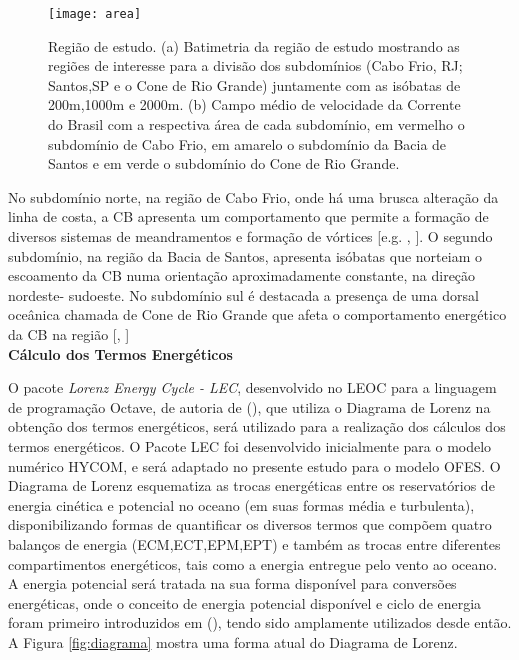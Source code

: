 \documentclass[portuguese,12pt,a4paper]{article}
\begin{document}
\begin{figure}[H]
	\centering
	\texttt{[image: area]}
	\caption{Região de estudo. (a) Batimetria da região de estudo mostrando as regiões de interesse para a divisão dos subdomínios (Cabo Frio, RJ; Santos,SP e o Cone de Rio Grande) juntamente com as isóbatas de 200m,1000m e 2000m. (b) Campo médio de velocidade da Corrente do Brasil com a respectiva área de cada subdomínio, em vermelho o subdomínio de Cabo Frio, em amarelo o subdomínio da Bacia de Santos e em verde o subdomínio do Cone de Rio Grande.}
	\label{fig:area}
\end{figure}

No subdomínio norte, na região de Cabo Frio, onde há uma brusca alteração da linha
de costa, a CB apresenta um comportamento que permite a formação de diversos sistemas de meandramentos e formação de vórtices [e.g. , \citeyear{mano2009energy}]. O
segundo subdomínio, na região da Bacia de Santos, apresenta isóbatas que norteiam o
escoamento da CB numa orientação aproximadamente constante, na direção nordeste-
sudoeste. No subdomínio sul é destacada a presença de uma dorsal oceânica
chamada de Cone de Rio Grande que afeta o comportamento energético da CB na
região [, \citeyear{Brum-2017}]\\

\textbf{Cálculo dos Termos Energéticos}

O pacote  \textit{Lorenz Energy Cycle - LEC}, desenvolvido no LEOC para a linguagem de programação Octave, de autoria de  (\citeyear{pacotelec}), que utiliza o Diagrama de Lorenz na obtenção dos termos energéticos, será utilizado
para a realização dos cálculos dos termos energéticos. O Pacote LEC foi desenvolvido inicialmente para o modelo numérico HYCOM, e será adaptado no presente estudo para o modelo OFES. O Diagrama de Lorenz esquematiza as trocas energéticas entre os reservatórios de energia cinética e potencial no oceano (em suas formas média e turbulenta), disponibilizando formas de quantificar os diversos termos que compõem quatro balanços de energia (ECM,ECT,EPM,EPT) e também as trocas entre diferentes compartimentos energéticos, tais como a energia entregue pelo vento ao oceano. A energia potencial será tratada na sua forma disponível para conversões energéticas, onde o conceito de energia potencial disponível e ciclo de energia foram primeiro introduzidos em  (\citeyear{margules1903uberdie}), tendo sido amplamente utilizados desde então. A Figura \ref{fig:diagrama} mostra uma forma atual do Diagrama de Lorenz.
\end{document}
